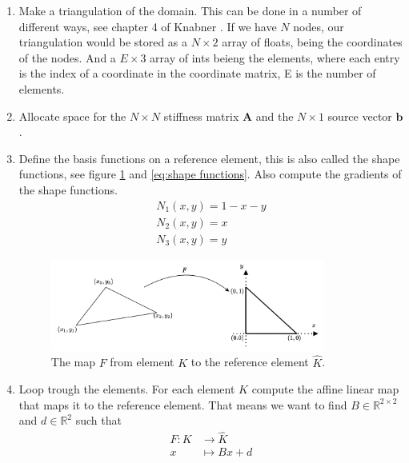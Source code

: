 \documentclass[../Main/main.tex]{subfiles}
\begin{document}
	\begin{enumerate}
		\item Make a triangulation of the domain. This can be done in a number of different ways, see chapter 4 of Knabner \cite{Knabner}. If we have $N$ nodes, our triangulation would be stored as a $N \times 2$ array of floats, being the coordinates of the nodes. And a $E\times 3$ array of ints beieng the elements, where each entry is the index of a coordinate in the coordinate matrix, E is the number of elements.
		\item Allocate space for the $N \times N$ stiffness matrix $\pmb{A}$ and the $N \times 1$ source vector $\pmb{b}$.
		\item Define the basis functions on a reference element, this is also called the shape functions, see figure \ref{fig:reference element} and \eqref{eq:shape functions}. Also compute the gradients of the shape functions. 
		\begin{equation}
			\begin{gathered}\label{eq:shape functions}
				N_1(x,y) = 1-x-y\\
				N_2(x,y) = x\\
				N_3(x,y) = y
			\end{gathered}
		\end{equation}
		\begin{figure}[H]
			\centering
			\includegraphics[width=0.85\textwidth]{reference element.pdf}
			\caption{The map $F$ from element $K$ to the reference element $\hat{K}$.}
			\label{fig:reference element}
		\end{figure}
		\item Loop trough the elements. For each element $K$ compute the affine linear map that maps it to the reference element. That means we want to find $B\in \mathbb{R}^{2\times 2}$ and $d\in \mathbb{R}^2$ such that 
		\begin{equation}
			\begin{aligned}
				F: K &\rightarrow \hat{K}\\
				x &\mapsto B x + d
			\end{aligned}
		\end{equation}

\end{enumerate}
\end{document}
